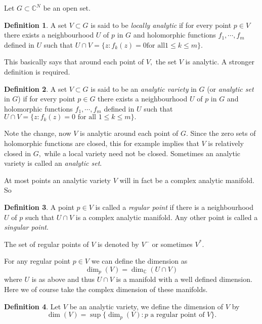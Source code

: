 \documentclass[12pt]{article}
\theoremstyle{theorem}
\theoremstyle{definition}
\newtheorem*{defn}{Definition}
\begin{document}
Let $G \subset {\mathbb{C}}^N$ be an open set.

\begin{defn}
A set $V \subset G$ is said to be {\em locally analytic}
if for every point $p \in V$ there exists a neighbourhood $U$ of $p$ in $G$
and holomorphic functions $f_1,\cdots,f_m$ defined in $U$ such that
$U \cap V = \{ z : f_k(z) = 0 \text{for all} 1\leq k \leq m \}.$
\end{defn}

This basically says that around each point of $V,$ the set $V$ is analytic.
A stronger definition is required.

\begin{defn}
A set $V \subset G$ is said to be an {\em analytic variety} in $G$
(or {\em analytic set} in $G$)
if for every point $p \in G$ there exists a neighbourhood $U$ of $p$ in $G$
and holomorphic functions $f_1,\cdots,f_m$ defined in $U$ such that
$U \cap V = \{ z : f_k(z) = 0 \text{ for all } 1\leq k \leq m \}.$
\end{defn}

Note the change, now $V$ is analytic around each point of $G.$  Since the
zero sets of holomorphic functions are closed, this for example implies that
$V$ is relatively closed in $G,$ while a local variety need not be closed.
Sometimes an analytic variety is called an {\em analytic set}.

At most points an analytic variety $V$ will in fact be a complex
analytic manifold.  So

\begin{defn}
A point $p \in V$ is called a {\em regular point} if there is a neighbourhood
$U$ of $p$ such that $U \cap V$ is a complex analytic manifold.  Any other
point is called a {\em singular point}.
\end{defn}

The set of regular points of $V$ is denoted by $V^-$ or sometimes $V^*.$

For any regular point $p \in V$ we can define the dimension as
\begin{equation*}
\operatorname{dim}_p(V) = 
\operatorname{dim}_{\mathbb{C}}(U \cap V)
\end{equation*}
where $U$ is as above and thus $U \cap V$ is a manifold with a well defined
dimension.  Here we of course take the complex dimension of these manifolds.

\begin{defn}
Let $V$ be an analytic variety,
we define the dimension of $V$ by
\begin{equation*}
\operatorname{dim}(V)
=
\sup \{ \operatorname{dim}_p(V) : p \text{ a regular point of } V \} .
\end{equation*}
\end{defn}
\end{document}
